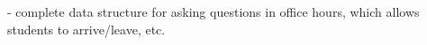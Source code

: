 - complete data structure for asking questions in office hours, which
allows students to arrive/leave, etc.